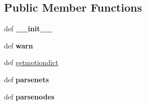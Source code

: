 \subsection*{Public Member Functions}
\begin{DoxyCompactItemize}
\item 
\hypertarget{classcore_1_1misc_1_1xmlparser0_1_1_core_document_parser0_a08a8716c44698db309277411e29301fe}{def {\bfseries \+\_\+\+\_\+init\+\_\+\+\_\+}}\label{classcore_1_1misc_1_1xmlparser0_1_1_core_document_parser0_a08a8716c44698db309277411e29301fe}

\item 
\hypertarget{classcore_1_1misc_1_1xmlparser0_1_1_core_document_parser0_ae492b778ef21ddc1d69dfdb12b154909}{def {\bfseries warn}}\label{classcore_1_1misc_1_1xmlparser0_1_1_core_document_parser0_ae492b778ef21ddc1d69dfdb12b154909}

\item 
def \hyperlink{classcore_1_1misc_1_1xmlparser0_1_1_core_document_parser0_a09d592a8b2536dd5aa3c85bcef30e964}{getmotiondict}
\item 
\hypertarget{classcore_1_1misc_1_1xmlparser0_1_1_core_document_parser0_ae45ae005ed450d2db83ceceeff4ae61f}{def {\bfseries parsenets}}\label{classcore_1_1misc_1_1xmlparser0_1_1_core_document_parser0_ae45ae005ed450d2db83ceceeff4ae61f}

\item 
\hypertarget{classcore_1_1misc_1_1xmlparser0_1_1_core_document_parser0_ab184cebfdd7665d85bfd6f7c3f8e6ed9}{def {\bfseries parsenodes}}\label{classcore_1_1misc_1_1xmlparser0_1_1_core_document_parser0_ab184cebfdd7665d85bfd6f7c3f8e6ed9}


\end{DoxyCompactItemize}
